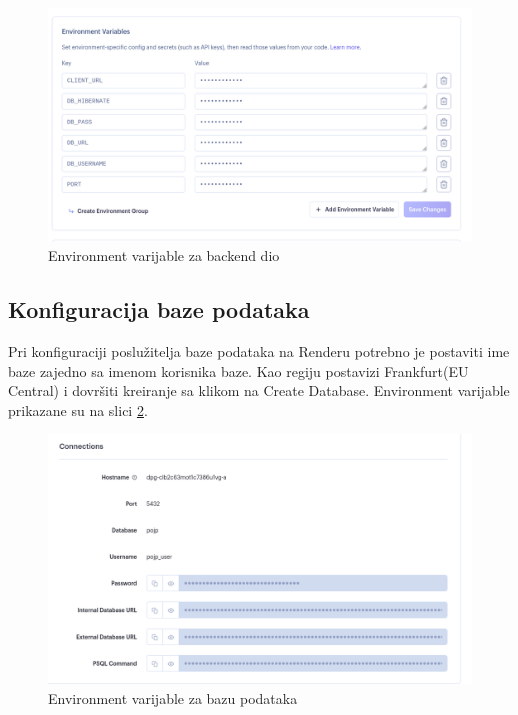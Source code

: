 			\begin{figure}[H]
			\includegraphics[scale=0.4]{slike/backendEnvironment.PNG} %
			\centering
			\caption{Environment varijable za backend dio}
			\label{fig:implementacija}
		\end{figure}
		
		\subsection{Konfiguracija baze podataka}
			
			Pri konfiguraciji poslužitelja baze podataka na Renderu potrebno je postaviti ime baze zajedno sa imenom korisnika baze. Kao regiju postavizi Frankfurt(EU Central) i dovršiti kreiranje sa klikom na Create Database. Environment varijable prikazane su na slici \ref{fig:implementacijaBaze}.
			
			\begin{figure}[H]
			\includegraphics[scale=0.4]{slike/bazaEnvironment.PNG} %
			\centering
			\caption{Environment varijable za bazu podataka}
			\label{fig:implementacijaBaze}
		\end{figure}
			
			\eject 